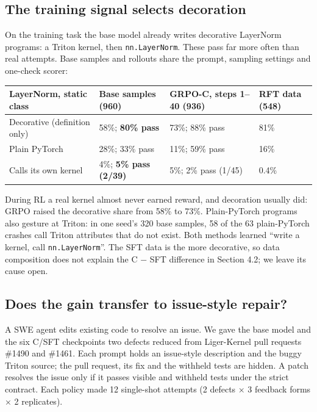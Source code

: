 \documentclass[11pt]{article}
\begin{document}
\subsection{The training signal selects decoration}\label{the-training-signal-selects-decoration}

On the training task the base model already writes decorative LayerNorm programs:
a Triton kernel, then \texttt{nn.\allowbreak{}LayerNorm}. These pass far more often than real attempts.
Base samples and rollouts share the prompt, sampling settings and one-check scorer:

\begin{center}\small
\begin{tabular}{@{}
  l
  l
  l
  l@{}}
\toprule\noalign{}
LayerNorm, static class & Base samples (960) & GRPO-C, steps 1--40 (936) & RFT data (548) \\
\midrule\noalign{}
Decorative (definition only) & 58\%; \textbf{80\% pass} & 73\%; 88\% pass & 81\% \\
Plain PyTorch & 28\%; 33\% pass & 11\%; 59\% pass & 16\% \\
Calls its own kernel & 4\%; \textbf{5\% pass (2/39)} & 5\%; 2\% pass (1/45) & 0.4\% \\
\bottomrule
\end{tabular}
\end{center}

During RL a real kernel almost never earned reward, and decoration usually did: GRPO
raised the decorative share from 58\% to 73\%. Plain-PyTorch programs also gesture at
Triton: in one seed's 320 base samples, 58 of the 63 plain-PyTorch crashes call Triton
attributes that do not exist. Both methods learned ``write a kernel, call
\texttt{nn.\allowbreak{}LayerNorm}''. The SFT data is the more decorative, so data composition does not
explain the C − SFT difference in Section 4.2; we leave its cause open.

\subsection{Does the gain transfer to issue-style repair?}\label{does-the-gain-transfer-to-issue-style-repair}

A SWE agent edits existing code to resolve an issue. We gave the base model and the
six C/SFT checkpoints two defects reduced from Liger-Kernel pull requests \#1490
and \#1461. Each prompt holds an issue-style description and the buggy Triton
source; the pull request, its fix and the withheld tests are hidden. A patch resolves
the issue only if it passes visible and withheld tests under the strict contract.
Each policy made 12 single-shot attempts (2 defects × 3 feedback forms × 2 replicates).
\end{document}
